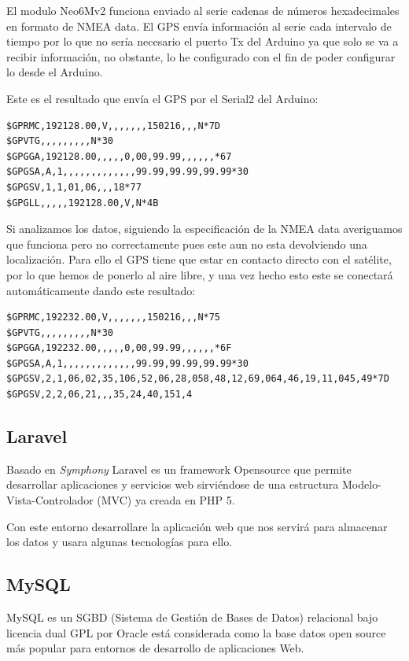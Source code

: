 El modulo Neo6Mv2 funciona enviado al serie cadenas de números hexadecimales en formato de NMEA data. El GPS envía información al serie cada intervalo de tiempo por lo que no sería necesario el puerto Tx del Arduino ya que solo se va a recibir información, no obstante, lo he configurado con el fin de poder configurar lo desde el Arduino.

Este es el resultado que envía el GPS por el Serial2 del Arduino:

\begin{lstlisting}
$GPRMC,192128.00,V,,,,,,,150216,,,N*7D
$GPVTG,,,,,,,,,N*30
$GPGGA,192128.00,,,,,0,00,99.99,,,,,,*67
$GPGSA,A,1,,,,,,,,,,,,,99.99,99.99,99.99*30
$GPGSV,1,1,01,06,,,18*77
$GPGLL,,,,,192128.00,V,N*4B
\end{lstlisting}
Si analizamos los datos, siguiendo la especificación de la NMEA data averiguamos que funciona pero no correctamente pues este aun no esta devolviendo una localización.
Para ello el GPS tiene que estar en contacto directo con el satélite, por lo que hemos de ponerlo al aire libre, y una vez hecho esto este se conectará automáticamente dando este resultado:

\begin{lstlisting}
$GPRMC,192232.00,V,,,,,,,150216,,,N*75
$GPVTG,,,,,,,,,N*30
$GPGGA,192232.00,,,,,0,00,99.99,,,,,,*6F
$GPGSA,A,1,,,,,,,,,,,,,99.99,99.99,99.99*30
$GPGSV,2,1,06,02,35,106,52,06,28,058,48,12,69,064,46,19,11,045,49*7D
$GPGSV,2,2,06,21,,,35,24,40,151,4
\end{lstlisting}

\subsection{Laravel}

Basado en \textit{Symphony} Laravel es un framework Opensource que permite desarrollar aplicaciones y servicios web sirviéndose de una estructura Modelo-Vista-Controlador (MVC) ya creada en PHP 5.

Con este entorno desarrollare la aplicación web que nos servirá para almacenar  los datos y usara algunas tecnologías para ello.

\subsection{MySQL}

\setlength{\parindent}{5ex}MySQL es un SGBD (Sistema de Gestión de Bases de Datos)  relacional bajo licencia dual GPL por Oracle está considerada como la base datos open source más popular para entornos de desarrollo de aplicaciones Web.

